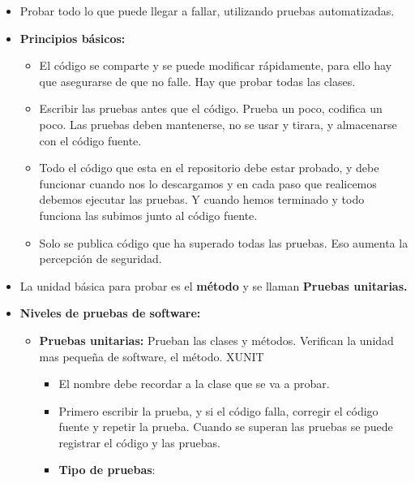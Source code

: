 \documentclass[12pt, twoside, openright]{report} %
\begin{document}
\begin{itemize}
\item Probar todo lo que puede llegar a fallar, utilizando pruebas
  automatizadas.
  
\item \textbf{Principios básicos:}
  

  \begin{itemize}
  \item El código se comparte y se puede modificar rápidamente, para ello
    hay que asegurarse de que no falle. Hay que probar todas las clases.
    
  \item Escribir las pruebas antes que el código. Prueba un poco, codifica
    un poco. Las pruebas deben mantenerse, no se usar y tirara, y
    almacenarse con el código fuente.
    
  \item Todo el código que esta en el repositorio debe estar probado, y debe
    funcionar cuando nos lo descargamos y en cada paso que realicemos
    debemos ejecutar las pruebas. Y cuando hemos terminado y todo
    funciona las subimos junto al código fuente.
    
  \item Solo se publica código que ha superado todas las pruebas. Eso
    aumenta la percepción de seguridad.
    
  \end{itemize}
\item La unidad básica para probar es el \textbf{método} y se llaman
  \textbf{Pruebas unitarias.}
  
\item \textbf{Niveles de pruebas de software:}
  

  \begin{itemize}
  \item \textbf{Pruebas unitarias:} Prueban las clases y métodos. Verifican
    la unidad mas pequeña de software, el método. XUNIT
    

    \begin{itemize}
    \item El nombre debe recordar a la clase que se va a probar.
      
    \item Primero escribir la prueba, y si el código falla, corregir el
      código fuente y repetir la prueba. Cuando se superan las pruebas
      se puede registrar el código y las pruebas.
      
    \item \textbf{Tipo de pruebas}:
      


\end{itemize}
\end{itemize}
\end{itemize}
\end{document}
